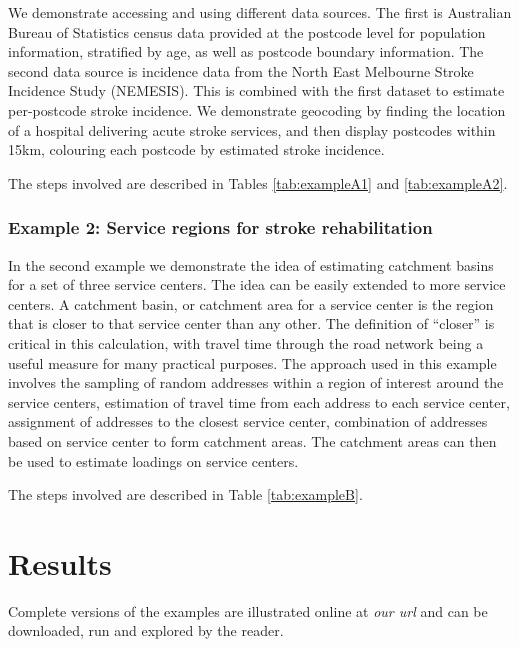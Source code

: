 \documentclass[utf8]{frontiersHLTH}
\begin{document}
We demonstrate accessing and using different data sources. The first is
Australian Bureau of Statistics census data provided at the postcode
level for population information, stratified by age, as well as postcode
boundary information. The second data source is incidence data from the
North East Melbourne Stroke Incidence Study (NEMESIS)\cite{thrift_stroke_2000}. This is combined
with the first dataset to estimate per-postcode stroke incidence. We
demonstrate geocoding by finding the location of a hospital delivering
acute stroke services, and then display postcodes within 15km, colouring
each postcode by estimated stroke incidence.

The steps involved are described in Tables \ref{tab:exampleA1} and \ref{tab:exampleA2}.

\subsubsection{Example 2: Service regions for stroke
rehabilitation}\label{example-2-service-regions-for-stroke-rehabilitation}

In the second example we demonstrate the idea of estimating catchment
basins for a set of three service centers. The idea can be easily
extended to more service centers. A catchment basin, or catchment area
for a service center is the region that is closer to that service center
than any other. The definition of ``closer'' is critical in this
calculation, with travel time through the road network being a useful
measure for many practical purposes. The approach used in this example
involves the sampling of random addresses within a region of interest
around the service centers, estimation of travel time from each address
to each service center, assignment of addresses to the closest service
center, combination of addresses based on service center to form
catchment areas. The catchment areas can then be used to estimate
loadings on service centers.

The steps involved are described in Table \ref{tab:exampleB}.

\section{Results}
Complete versions of the examples are illustrated online at {\em our
  url} and can be downloaded, run and explored by the reader.
\end{document}
